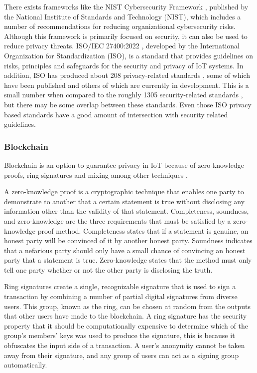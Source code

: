 There exists frameworks like the NIST Cybersecurity Framework \cite{barrett2018framework},
published by the National Institute of Standards and Technology (NIST),
which includes a number of recommendations for reducing organizational
cybersecurity risks. Although this framework is primarily focused on
security, it can also be used to reduce privacy threats.
ISO/IEC 27400:2022 \cite{iso2022cybersecurity}, developed by the International
Organization for Standardization (ISO), is a standard that provides
guidelines on risks, principles and safeguards for the security and
privacy of IoT systems. In addition, ISO has produced about 208 privacy-related
standards \cite{iso2023privacysearch}, some of which have been published
and others of which are currently in development. This is a small number
when compared to the roughly 1305 security-related standards \cite{iso2023securitysearch},
but there may be some overlap between these standards. Even those ISO privacy
based standards have a good amount of intersection with security related
guidelines.

\subsubsection{Blockchain}

Blockchain is an option to guarantee privacy in IoT because of zero-knowledge
proofs, ring signatures \cite{mercer2016privacy} and mixing
among other techniques \cite{zhang2019security}.

A zero-knowledge proof is a cryptographic technique that enables one party
to demonstrate to another that a certain statement is true without disclosing
any information other than the validity of that statement. Completeness, soundness,
and zero-knowledge are the three requirements that must be satisfied by a
zero-knowledge proof method. Completeness states that if a
statement is genuine, an honest party will be convinced of it by another honest
party. Soundness indicates that a nefarious party should only have a small chance
of convincing an honest party that a statement is true. Zero-knowledge states
that the method must only tell one party whether or not the other party is
disclosing the truth.

Ring signatures create a single, recognizable signature that is used to sign
a transaction by combining a number of partial digital signatures from diverse
users. This group, known as the ring, can be chosen at random from the outputs
that other users have made to the blockchain. A ring signature has the security
property that it should be computationally expensive to determine which
of the group's members' keys was used to produce the signature, this is because
it obfuscates the input side of a transaction. A user's anonymity cannot
be taken away from their signature, and any group of users can act as a signing
group automatically.

